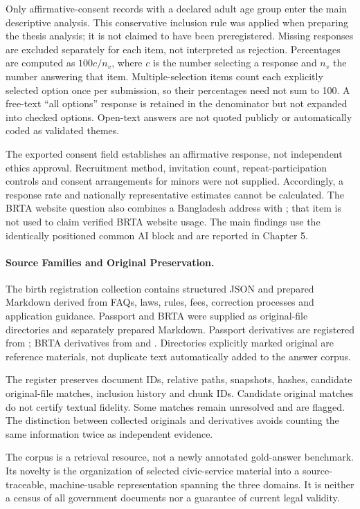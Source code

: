Only affirmative-consent records with a declared adult age group enter the main descriptive analysis. This conservative inclusion rule was applied when preparing the thesis analysis; it is not claimed to have been preregistered. Missing responses are excluded separately for each item, not interpreted as rejection. Percentages are computed as $100c/n_v$, where $c$ is the number selecting a response and $n_v$ the number answering that item. Multiple-selection items count each explicitly selected option once per submission, so their percentages need not sum to 100. A free-text ``all options'' response is retained in the denominator but not expanded into checked options. Open-text answers are not quoted publicly or automatically coded as validated themes.

The exported consent field establishes an affirmative response, not independent ethics approval. Recruitment method, invitation count, repeat-participation controls and consent arrangements for minors were not supplied. Accordingly, a response rate and nationally representative estimates cannot be calculated. The BRTA website question also combines a Bangladesh address with ; that item is not used to claim verified BRTA website usage. The main findings use the identically positioned common AI block and are reported in Chapter 5.

\paragraph{Source Families and Original Preservation.}
The birth registration collection contains structured JSON and prepared Markdown derived from FAQs, laws, rules, fees, correction processes and application guidance. Passport and BRTA were supplied as original-file directories and separately prepared Markdown. Passport derivatives are registered from ; BRTA derivatives from  and . Directories explicitly marked original are reference materials, not duplicate text automatically added to the answer corpus.

The register preserves document IDs, relative paths, snapshots, hashes, candidate original-file matches, inclusion history and chunk IDs. Candidate original matches do not certify textual fidelity. Some matches remain unresolved and are flagged. The distinction between collected originals and derivatives avoids counting the same information twice as independent evidence.

The corpus is a retrieval resource, not a newly annotated gold-answer benchmark. Its novelty is the organization of selected civic-service material into a source-traceable, machine-usable representation spanning the three domains. It is neither a census of all government documents nor a guarantee of current legal validity.

